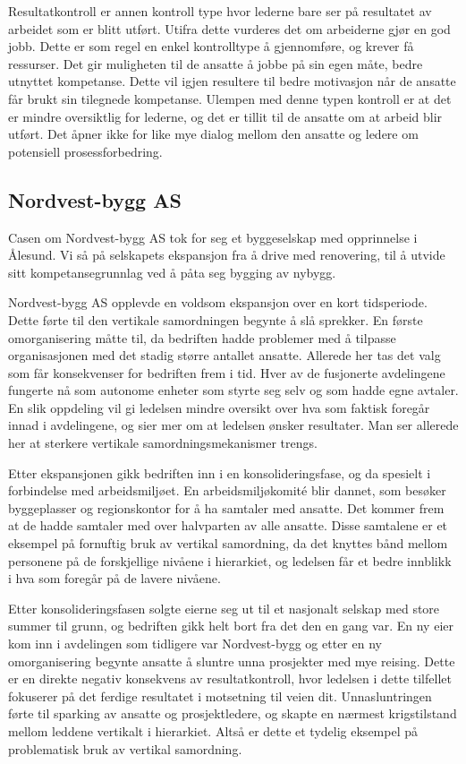 \documentclass[11]{article}
\begin{document}
Resultatkontroll er annen kontroll type hvor lederne bare ser på resultatet av arbeidet som er blitt utført. Utifra dette vurderes det om arbeiderne gjør en god jobb. Dette er som regel en enkel kontrolltype å gjennomføre, og krever få ressurser. Det gir muligheten til de ansatte å jobbe på sin egen måte, bedre utnyttet kompetanse. Dette vil igjen resultere til bedre motivasjon når de ansatte får brukt sin tilegnede kompetanse. Ulempen med denne typen kontroll er at det er mindre oversiktlig for lederne, og det er tillit til de ansatte om at arbeid blir utført. Det åpner ikke for like mye dialog mellom den ansatte og ledere om potensiell prosessforbedring. 

\subsection{Nordvest-bygg AS}

Casen om Nordvest-bygg AS tok for seg et byggeselskap med opprinnelse i Ålesund. Vi så på selskapets ekspansjon fra å drive med renovering, til å utvide sitt kompetansegrunnlag ved å påta seg bygging av nybygg.

Nordvest-bygg AS opplevde en voldsom ekspansjon over en kort tidsperiode. Dette førte til den vertikale samordningen begynte å slå sprekker. En første omorganisering måtte til, da bedriften hadde problemer med å tilpasse organisasjonen med det stadig større antallet ansatte. Allerede her tas det valg som får konsekvenser for bedriften frem i tid. Hver av de fusjonerte avdelingene fungerte nå som autonome enheter som styrte seg selv og som hadde egne avtaler. En slik oppdeling vil gi ledelsen mindre oversikt over hva som faktisk foregår innad i avdelingene, og sier mer om at ledelsen ønsker resultater. Man ser allerede her at sterkere vertikale samordningsmekanismer trengs.

Etter ekspansjonen gikk bedriften inn i en konsolideringsfase, og da spesielt i forbindelse med arbeidsmiljøet. En arbeidsmiljøkomité blir dannet, som besøker byggeplasser og regionskontor for å ha samtaler med ansatte. Det kommer frem at de hadde samtaler med over halvparten av alle ansatte. Disse samtalene er et eksempel på fornuftig bruk av vertikal samordning, da det knyttes bånd mellom personene på de forskjellige nivåene i hierarkiet, og ledelsen får et bedre innblikk i hva som foregår på de lavere nivåene.

Etter konsolideringsfasen solgte eierne seg ut til et nasjonalt selskap med store summer til grunn, og bedriften gikk helt bort fra det den en gang var. En ny eier kom inn i avdelingen som tidligere var Nordvest-bygg og etter en ny omorganisering begynte ansatte å sluntre unna prosjekter med mye reising. Dette er en direkte negativ konsekvens av resultatkontroll, hvor ledelsen i dette tilfellet fokuserer på det ferdige resultatet i motsetning til veien dit. Unnasluntringen førte til sparking av ansatte og prosjektledere, og skapte en nærmest krigstilstand mellom leddene vertikalt i hierarkiet. Altså er dette et tydelig eksempel på problematisk bruk av vertikal samordning.
\end{document}
